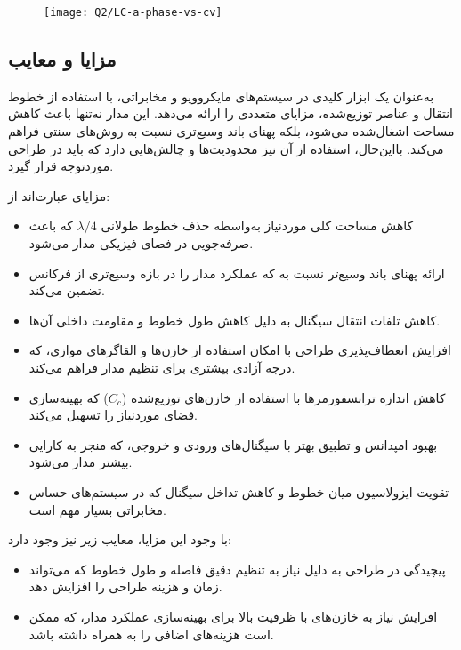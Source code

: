 \documentclass[12pt,onecolumn,a4paper]{article}
\begin{document}
\begin{figure}[H]
	\centering
	\texttt{[image: Q2/LC-a-phase-vs-cv]}
	\caption{}
	\label{fig:lc-a-phase-vs-cv}
\end{figure}



\subsection*{مزایا و معایب }

 به‌عنوان یک ابزار کلیدی در سیستم‌های مایکروویو و مخابراتی، با استفاده از خطوط انتقال و عناصر توزیع‌شده، مزایای متعددی را ارائه می‌دهد. این مدار نه‌تنها باعث کاهش مساحت اشغال‌شده می‌شود، بلکه پهنای باند وسیع‌تری نسبت به روش‌های سنتی فراهم می‌کند. بااین‌حال، استفاده از آن نیز محدودیت‌ها و چالش‌هایی دارد که باید در طراحی موردتوجه قرار گیرد.

\noindent مزایای  عبارت‌اند از:
\begin{itemize}
	\item کاهش مساحت کلی موردنیاز به‌واسطه حذف خطوط طولانی \(\lambda/4\) که باعث صرفه‌جویی در فضای فیزیکی مدار می‌شود.
	\item ارائه پهنای باند وسیع‌تر نسبت به  که عملکرد مدار را در بازه وسیع‌تری از فرکانس تضمین می‌کند.
	\item کاهش تلفات انتقال سیگنال به دلیل کاهش طول خطوط و مقاومت داخلی آن‌ها.
	\item افزایش انعطاف‌پذیری طراحی با امکان استفاده از خازن‌ها و القاگرهای موازی، که درجه آزادی بیشتری برای تنظیم مدار فراهم می‌کند.
	\item کاهش اندازه ترانسفورمرها با استفاده از خازن‌های توزیع‌شده (\(C_c\)) که بهینه‌سازی فضای موردنیاز را تسهیل می‌کند.
	\item بهبود امپدانس و تطبیق بهتر با سیگنال‌های ورودی و خروجی، که منجر به کارایی بیشتر مدار می‌شود.
	\item تقویت ایزولاسیون میان خطوط و کاهش تداخل سیگنال که در سیستم‌های حساس مخابراتی بسیار مهم است.
\end{itemize}

\noindent با وجود این مزایا، معایب زیر نیز وجود دارد:
\begin{itemize}
	\item پیچیدگی در طراحی به دلیل نیاز به تنظیم دقیق فاصله و طول خطوط که می‌تواند زمان و هزینه طراحی را افزایش دهد.
	\item افزایش نیاز به خازن‌های با ظرفیت بالا برای بهینه‌سازی عملکرد مدار، که ممکن است هزینه‌های اضافی را به همراه داشته باشد.
\end{itemize}
\end{document}
